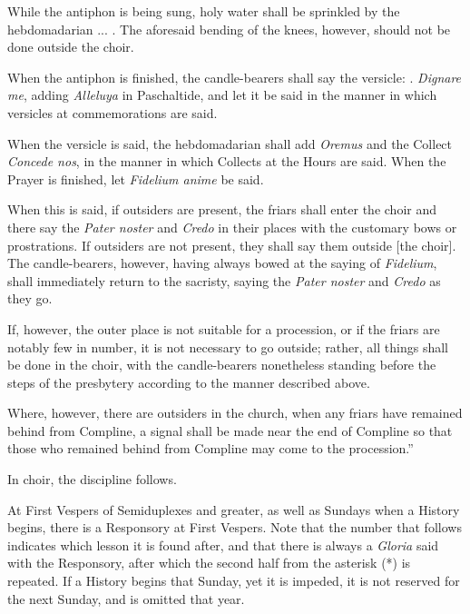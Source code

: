 While the antiphon is being sung, holy water shall be sprinkled by the hebdomadarian ... . The aforesaid bending of the knees, however, should not be done outside the choir.

When the antiphon is finished, the candle-bearers shall say the versicle: \Vbar . \emph{Dignare me}, adding \emph{Alleluya} in Paschaltide, and let it be said in the manner in which versicles at commemorations are said.

When the versicle is said, the hebdomadarian shall add \emph{Oremus} and the Collect \emph{Concede nos}, in the manner in which Collects at the Hours are said. When the Prayer is finished, let \emph{Fidelium anime} be said.

When this is said, if outsiders are present, the friars shall enter the choir and there say the \emph{Pater noster} and \emph{Credo} in their places with the customary bows or prostrations. If outsiders are not present, they shall say them outside [the choir]. The candle-bearers, however, having always bowed at the saying of \emph{Fidelium}, shall immediately return to the sacristy, saying the \emph{Pater noster} and \emph{Credo} as they go.

If, however, the outer place is not suitable for a procession, or if the friars are notably few in number, it is not necessary to go outside; rather, all things shall be done in the choir, with the candle-bearers nonetheless standing before the steps of the presbytery according to the manner described above.

Where, however, there are outsiders in the church, when any friars have remained behind from Compline, a signal shall be made near the end of Compline so that those who remained behind from Compline may come to the procession.''

In choir, the discipline follows.





At First Vespers of Semiduplexes and greater, as well as Sundays when a History begins, there is a Responsory at First Vespers. Note that the number that follows indicates which lesson it is found after, and that there is always a \emph{Gloria} said with the Responsory, after which the second half from the asterisk (*) is repeated. If a History begins that Sunday, yet it is impeded, it is not reserved for the next Sunday, and is omitted that year.


